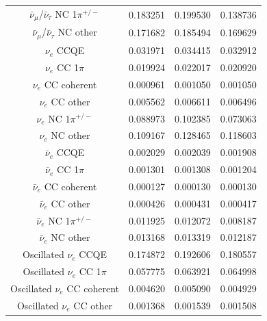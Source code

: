 \begin{table}
\begin{tabular}{| c | c | c | c | }
$\bar{\nu}_{\mu}$/$\bar{\nu}_{\tau}$ NC 1$\pi^{+/-}$ &   0.183251   &   0.199530       &   0.138736 \\
$\bar{\nu}_{\mu}$/$\bar{\nu}_{\tau}$ NC other        &   0.171682   &   0.185494       &   0.169629 \\
$\nu_e$ CCQE                                         &   0.031971   &   0.034415       &   0.032912 \\
$\nu_e$ CC 1$\pi$                                    &   0.019924   &   0.022017       &   0.020920 \\
$\nu_e$ CC coherent                                  &   0.000961   &   0.001050       &   0.001050 \\
$\nu_e$ CC other                                     &   0.005562   &   0.006611       &   0.006496 \\
$\nu_e$ NC 1$\pi^{+/-}$                              &   0.088973   &   0.102385       &   0.073063 \\
$\nu_e$ NC other                                     &   0.109167   &   0.128465       &   0.118603 \\
$\bar{\nu}_{e}$ CCQE                                 &   0.002029   &   0.002039       &   0.001908 \\
$\bar{\nu}_{e}$ CC 1$\pi$                            &   0.001301   &   0.001308       &   0.001204 \\
$\bar{\nu}_{e}$ CC coherent                          &   0.000127   &   0.000130       &   0.000130 \\
$\bar{\nu}_{e}$ CC other                             &   0.000426   &   0.000431       &   0.000417 \\
$\bar{\nu}_{e}$ NC 1$\pi^{+/-}$                      &   0.011925   &   0.012072       &   0.008187 \\
$\bar{\nu}_{e}$ NC other                             &   0.013168   &   0.013319       &   0.012187 \\
Oscillated $\nu_e$ CCQE                              &   0.174872   &   0.192606       &   0.180557 \\
Oscillated $\nu_e$ CC 1$\pi$                         &   0.057775   &   0.063921       &   0.064998 \\
Oscillated $\nu_e$ CC coherent                       &   0.004620   &   0.005090       &   0.004929 \\
Oscillated $\nu_e$ CC other                          &   0.001368   &   0.001539       &   0.001508 \\
\hline
\end{tabular}

\end{table}
